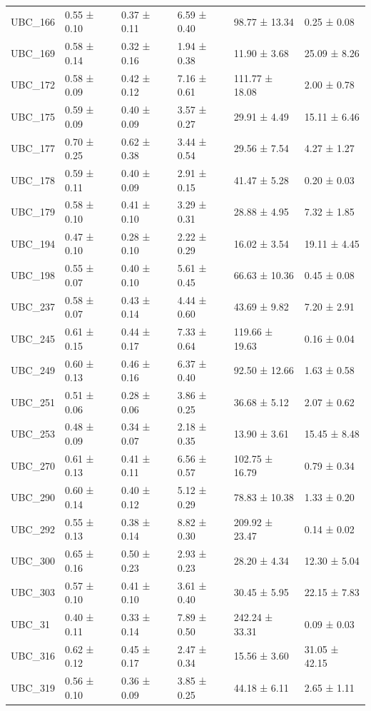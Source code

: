 \begin{tabular}{llllll}
UBC_166 & 0.55 ± 0.10 & 0.37 ± 0.11 & 6.59 ± 0.40 & 98.77 ± 13.34 & 0.25 ± 0.08 \\
UBC_169 & 0.58 ± 0.14 & 0.32 ± 0.16 & 1.94 ± 0.38 & 11.90 ± 3.68 & 25.09 ± 8.26 \\
UBC_172 & 0.58 ± 0.09 & 0.42 ± 0.12 & 7.16 ± 0.61 & 111.77 ± 18.08 & 2.00 ± 0.78 \\
UBC_175 & 0.59 ± 0.09 & 0.40 ± 0.09 & 3.57 ± 0.27 & 29.91 ± 4.49 & 15.11 ± 6.46 \\
UBC_177 & 0.70 ± 0.25 & 0.62 ± 0.38 & 3.44 ± 0.54 & 29.56 ± 7.54 & 4.27 ± 1.27 \\
UBC_178 & 0.59 ± 0.11 & 0.40 ± 0.09 & 2.91 ± 0.15 & 41.47 ± 5.28 & 0.20 ± 0.03 \\
UBC_179 & 0.58 ± 0.10 & 0.41 ± 0.10 & 3.29 ± 0.31 & 28.88 ± 4.95 & 7.32 ± 1.85 \\
UBC_194 & 0.47 ± 0.10 & 0.28 ± 0.10 & 2.22 ± 0.29 & 16.02 ± 3.54 & 19.11 ± 4.45 \\
UBC_198 & 0.55 ± 0.07 & 0.40 ± 0.10 & 5.61 ± 0.45 & 66.63 ± 10.36 & 0.45 ± 0.08 \\
UBC_237 & 0.58 ± 0.07 & 0.43 ± 0.14 & 4.44 ± 0.60 & 43.69 ± 9.82 & 7.20 ± 2.91 \\
UBC_245 & 0.61 ± 0.15 & 0.44 ± 0.17 & 7.33 ± 0.64 & 119.66 ± 19.63 & 0.16 ± 0.04 \\
UBC_249 & 0.60 ± 0.13 & 0.46 ± 0.16 & 6.37 ± 0.40 & 92.50 ± 12.66 & 1.63 ± 0.58 \\
UBC_251 & 0.51 ± 0.06 & 0.28 ± 0.06 & 3.86 ± 0.25 & 36.68 ± 5.12 & 2.07 ± 0.62 \\
UBC_253 & 0.48 ± 0.09 & 0.34 ± 0.07 & 2.18 ± 0.35 & 13.90 ± 3.61 & 15.45 ± 8.48 \\
UBC_270 & 0.61 ± 0.13 & 0.41 ± 0.11 & 6.56 ± 0.57 & 102.75 ± 16.79 & 0.79 ± 0.34 \\
UBC_290 & 0.60 ± 0.14 & 0.40 ± 0.12 & 5.12 ± 0.29 & 78.83 ± 10.38 & 1.33 ± 0.20 \\
UBC_292 & 0.55 ± 0.13 & 0.38 ± 0.14 & 8.82 ± 0.30 & 209.92 ± 23.47 & 0.14 ± 0.02 \\
UBC_300 & 0.65 ± 0.16 & 0.50 ± 0.23 & 2.93 ± 0.23 & 28.20 ± 4.34 & 12.30 ± 5.04 \\
UBC_303 & 0.57 ± 0.10 & 0.41 ± 0.10 & 3.61 ± 0.40 & 30.45 ± 5.95 & 22.15 ± 7.83 \\
UBC_31 & 0.40 ± 0.11 & 0.33 ± 0.14 & 7.89 ± 0.50 & 242.24 ± 33.31 & 0.09 ± 0.03 \\
UBC_316 & 0.62 ± 0.12 & 0.45 ± 0.17 & 2.47 ± 0.34 & 15.56 ± 3.60 & 31.05 ± 42.15 \\
UBC_319 & 0.56 ± 0.10 & 0.36 ± 0.09 & 3.85 ± 0.25 & 44.18 ± 6.11 & 2.65 ± 1.11 \\

\end{tabular}

